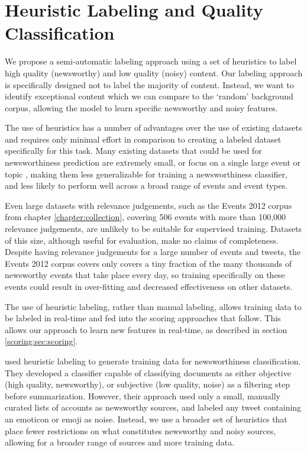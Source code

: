 
\section{Heuristic Labeling and Quality Classification}
\label{scoring:sec:labelling}
We propose a semi-automatic labeling approach using a set of heuristics to label high quality (newsworthy) and low quality (noisy) content.
Our labeling approach is specifically designed not to label the majority of content.
Instead, we want to identify exceptional content which we can compare to the `random' background corpus, allowing the model to learn specific newsworthy and noisy features.

The use of heuristics has a number of advantages over the use of existing datasets and requires only minimal effort in comparison to creating a labeled dataset specifically for this task.
Many existing datasets that could be used for newsworthiness prediction are extremely small, or focus on a single large event or topic \citep{Kang12, Madhawa15}, making them less generalizable for training a newsworthiness classifier, and less likely to perform well across a broad range of events and event types.

Even large datasets with relevance judgements, such as the Events 2012 corpus from chapter \ref{chapter:collection}, covering 506 events with more than 100,000 relevance judgements, are unlikely to be suitable for supervised training.
Datasets of this size, although useful for evaluation, make no claims of completeness.
Despite having relevance judgements  for a large number of events and tweets, the Events 2012 corpus covers only covers a tiny fraction of the many thousands of newsworthy events that take place every day, so training specifically on these events could result in over-fitting and decreased effectiveness on other datasets.

The use of heuristic labeling, rather than manual labeling, allows training data to be labeled in real-time and fed into the scoring approaches that follow.
This allows our approach to learn new features in real-time, as described in section \ref{scoring:sec:scoring}.

\cite{Madhawa15} used heuristic labeling to generate training data for newsworthiness classification.
They developed a classifier capable of classifying documents as either objective (high quality, newsworthy), or subjective (low quality, noise) as a filtering step before summarization.
However, their approach used only a small, manually curated lists of accounts as newsworthy sources, and labeled any tweet containing an emoticon or emoji as noise.
Instead, we use a broader set of heuristics that place fewer restrictions on what constitutes newsworthy and noisy sources, allowing for a broader range of sources and more training data.

